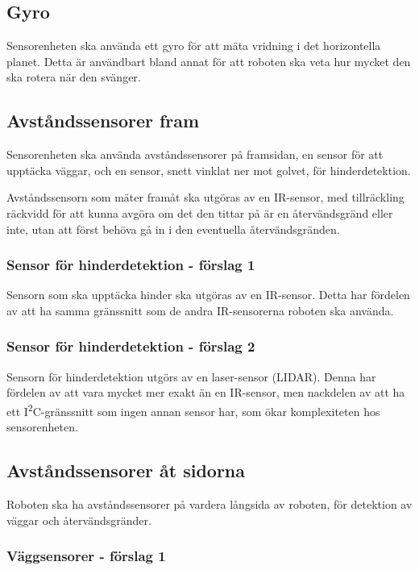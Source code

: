 \documentclass[a4paper,titlepage,12pt]{article}
\newcommand{\itc}{I\textsuperscript{2}C}
\begin{document}
    \subsection{Gyro}
    
    Sensorenheten ska använda ett gyro för att mäta vridning i det horizontella
    planet. Detta är användbart bland annat för att roboten ska veta hur mycket
    den ska rotera när den svänger.
    
    \subsection{Avståndssensorer fram}
    
    Sensorenheten ska använda avståndssensorer på framsidan, en sensor för att
    upptäcka väggar, och en sensor, snett vinklat ner mot golvet, för hinderdetektion. 

    Avståndssensorn som mäter framåt ska utgöras av en IR-sensor, med
    tillräckling räckvidd för att kunna avgöra om det den tittar på är en
    återvändsgränd eller inte, utan att först behöva gå in i den eventuella
    återvändsgränden.

    \subsubsection{Sensor för hinderdetektion - förslag 1}

    Sensorn som ska upptäcka hinder ska utgöras av en IR-sensor. Detta
    har fördelen av att ha samma gränssnitt som de andra IR-sensorerna roboten
    ska använda.

    \subsubsection{Sensor för hinderdetektion - förslag 2}

    Sensorn för hinderdetektion utgörs av en laser-sensor (LIDAR). Denna har
    fördelen av att vara mycket mer exakt än en IR-sensor, men nackdelen av att
    ha ett \itc-gränssnitt som ingen annan sensor har, som ökar
    komplexiteten hos sensorenheten.

    \subsection{Avståndssensorer åt sidorna}
    Roboten ska ha avståndssensorer på vardera långsida av roboten, för
    detektion av väggar och återvändsgränder.

    \subsubsection{Väggsensorer - förslag 1}
    
\end{document}
